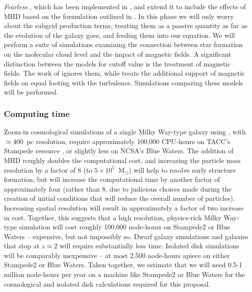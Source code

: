 {\emph{Fearless}  \citep{Maier09}, which has been implemented in \enzo, and extend
it to include the effects of MHD based on the formulation outlined in
\citep{Chernyshov14}.  In this phase we will only worry about the subgrid
production terms, treating them as a passive quantity as far as the evolution of
the galaxy goes, and feeding them into our equation.
We 
will perform a suite of simulations examining the connection between star
formation on the molecular cloud level and the impact of magnetic fields.  A
significant distinction between the models for cutoff value is the treatment of
magnetic fields.  The work of \citet{Krumholz05} ignores them, while
\citet{Padoan11} treats the additional support of magnetic fields on equal
footing with the turbulence.  Simulations comparing these models will be
performed.
}

\vspace{-3mm}
\subsubsection{Computing time}
\label{sec:comptime_sims}
\vspace{-2mm}

Zoom-in cosmological simulations of a single Milky Way-type galaxy
using \enzo, with $\simeq 400$~pc resolution, require approximately
100,000 CPU-hours on TACC's Stampede resource
\cite{2012ApJ...749..140H,2012ApJ...759..137J,2013MNRAS.430.1548H}, or
slightly less on NCSA's Blue Waters.  The addition of MHD roughly
doubles the computational cost, and increasing the particle mass
resolution by a factor of 8 (to $5 \times 10^5$~M$_\odot$) will help
to resolve early structure formation, but will increase the
computational time by another factor of approximately four (rather
than 8, due to judicious choices made during the creation of initial
conditions that will reduce the overall number of particles).
Increasing spatial resolution will result in approximately a factor of
two increase in cost.  Together, this suggests that a high resolution,
physics-rich Milky Way-type simulation will cost roughly 100,000
node-hours on Stampede2 or Blue Waters -- expensive, but not impossibly
so.  Dwarf galaxy simulations and galaxies that stop at $z \simeq 2$
will require substantially less time.  Isolated disk simulations will
be comparably inexpensive -- at most 2,500 node-hours apiece on either
Stampede2 or Blue Waters.  Taken together, we estimate that we will
need 0.5-1 million node-hours per year on a machine like Stampede2 or
Blue Waters for the cosmological and isolated disk calculations
required for this proposal.

